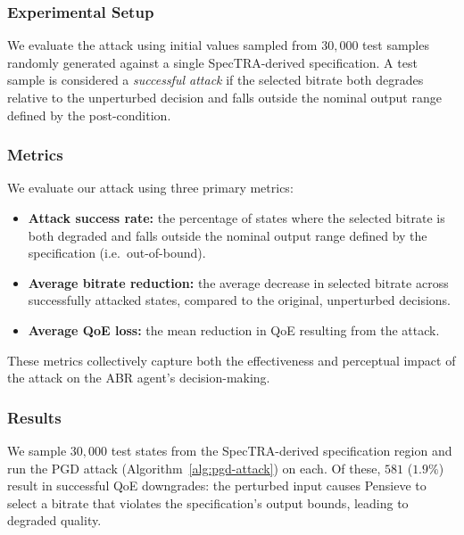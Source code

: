 \documentclass[thesis]{uofithesis} %
\begin{document}
    
    \subsubsection{Experimental Setup}
    \label{sec:attack-setup}
    
    We evaluate the attack using initial values sampled from $30{,}000$ test samples 
    randomly generated against a single SpecTRA-derived specification.  A test sample is considered a \emph{successful attack}
    if the selected bitrate both degrades relative to the unperturbed
    decision and falls outside the nominal output range defined by the
    post-condition.
    
    
    \subsubsection{Metrics}
    \label{sec:attack-metrics}
    
    We evaluate our attack using three primary metrics:
    \begin{itemize}
        \item \textbf{Attack success rate:} the percentage of states where
            the selected bitrate is both degraded and falls outside the
            nominal output range defined by the specification (i.e.\
            out-of-bound).
        \item \textbf{Average bitrate reduction:} the average decrease in
            selected bitrate across successfully attacked states, compared
            to the original, unperturbed decisions.
        \item \textbf{Average QoE loss:} the mean reduction in QoE
            resulting from the attack.
    \end{itemize}
    These metrics collectively capture both the effectiveness and
    perceptual impact of the attack on the ABR agent's decision-making.
    
    
    \subsubsection{Results}
    \label{sec:attack-results}
    
    We sample $30{,}000$ test states from the SpecTRA-derived
    specification region and run the PGD attack
    (Algorithm~\ref{alg:pgd-attack}) on each.  Of these, $581$ ($1.9\%$)
    result in successful QoE downgrades: the perturbed input causes
    Pensieve to select a bitrate that violates the specification's
    output bounds, leading to degraded quality.
    
\end{document}
